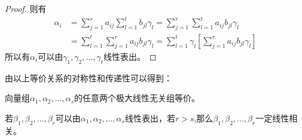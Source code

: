 \documentclass[blue,normal,cn]{elegantnote}
\begin{document}
\begin{theorem}
\begin{proof}
    则有
    \begin{equation*}
        \begin{aligned}
            α_i&=\sum_{j=1}^{r}a_{ij}\sum_{l=1}^{t}b_{jl}γ_{l}=\sum_{j=1}^{r}\sum_{l=1}^{t}a_{ij}b_{jl}γ_{l}\\
            &=\sum_{l=1}^{t}\sum_{j=1}^{r}a_{ij}b_{jl}γ_{l}=\sum_{l=1}^{t}γ_{l}\left[\sum_{j=1}^{r}a_{ij}b_{jl}γ_{l}\right]
        \end{aligned}
    \end{equation*}
    所以有$α_i$可以由$γ_1,γ_2,...,γ_t$线性表出。
\end{proof}
由以上等价关系的对称性和传递性可以得到：
\begin{proposition}
向量组$α_1,α_2,...,α_s$的任意两个极大线性无关组等价。
\end{proposition}

\begin{lemma}
若$β_1,β_2,...,β_r$可以由$α_1,α_2,...,α_s$线性表出，若$r>s$,那么$β_1,β_2,...,β_r$一定线性相关。
\end{lemma}


\end{theorem}
\end{document}
